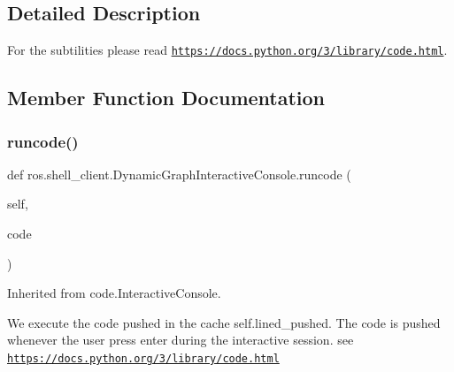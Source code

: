 \subsection{Detailed Description}
For the subtilities please read \href{https://docs.python.org/3/library/code.html}{\tt https\+://docs.\+python.\+org/3/library/code.\+html}. 

\subsection{Member Function Documentation}
\mbox{\label{classros_1_1shell__client_1_1DynamicGraphInteractiveConsole_ae2781aac94d439abbdc158961562342f}} 
\subsubsection{\texorpdfstring{runcode()}{runcode()}}
{\footnotesize\ttfamily def ros.\+shell\+\_\+client.\+Dynamic\+Graph\+Interactive\+Console.\+runcode (\begin{DoxyParamCaption}\item[{}]{self,  }\item[{}]{code }\end{DoxyParamCaption})}



Inherited from code.\+Interactive\+Console. 

We execute the code pushed in the cache {\ttfamily self.\+lined\+\_\+pushed}. The code is pushed whenever the user press enter during the interactive session. see \href{https://docs.python.org/3/library/code.html}{\tt https\+://docs.\+python.\+org/3/library/code.\+html} \mbox{\label{classros_1_1shell__client_1_1DynamicGraphInteractiveConsole_afe6b432e407d107434ccc105a99f7746}} 

